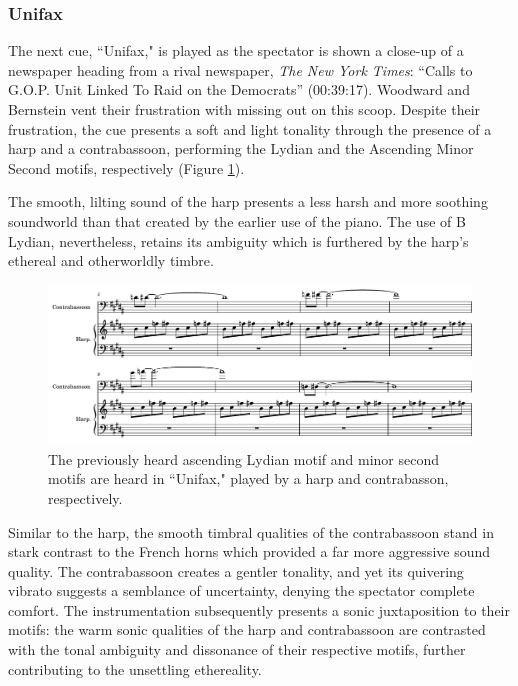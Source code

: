\subsubsection{Unifax}

The next cue, ``Unifax," is played as the spectator is shown a close-up of a newspaper heading from a rival newspaper, \textit{The New York Times}: ``Calls to G.O.P. Unit Linked To Raid on the Democrats” (00:39:17).
Woodward and Bernstein vent their frustration with missing out on this scoop. Despite their frustration, the cue presents a soft and light tonality through the presence of a harp and a contrabassoon, performing the Lydian and the Ascending Minor Second motifs, respectively (Figure \ref{fig:president-unifax}).

The smooth, lilting sound of the harp presents a less harsh and more soothing soundworld than that created by the earlier use of the piano.
The use of B Lydian, nevertheless, retains its ambiguity which is furthered by the harp’s ethereal and otherworldly timbre.

\begin{figure}
    \centering
    \includegraphics[width=1\linewidth]{img/president-unifax.pdf}
    \caption{The previously heard ascending Lydian motif and minor second motifs are heard in ``Unifax," played by a harp and contrabasson, respectively.}
    \label{fig:president-unifax}
\end{figure}
Similar to the harp, the smooth timbral qualities of the contrabassoon stand in stark contrast to the French horns which provided a far more aggressive sound quality.
The contrabassoon creates a gentler tonality, and yet its quivering vibrato suggests a semblance of uncertainty, denying the spectator complete comfort.
The instrumentation subsequently presents a sonic juxtaposition to their motifs: the warm sonic qualities of the harp and contrabassoon are contrasted with the tonal ambiguity and dissonance of their respective motifs, further contributing to the unsettling ethereality. 

